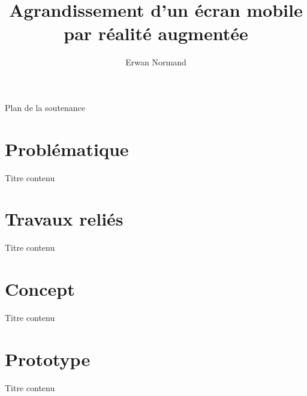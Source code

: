
\usepackage{lmodern}
\usepackage[french]{babel}
\usepackage[utf8]{inputenc}
\usepackage[T1]{fontenc}

 {
}

\title[Agrandissement d'un écran mobile par RA]{Agrandissement d'un écran mobile par réalité augmentée}
\author[Erwan Normand]{Erwan Normand}%
\date{}



\maketitle

\begin{frame}{Plan de la soutenance}
  \tableofcontents
\end{frame}


\section{Problématique} %
\begin{frame}{Titre}
  contenu
\end{frame}


\section{Travaux reliés} %
\begin{frame}{Titre}
  contenu
\end{frame}


\section{Concept} %
\begin{frame}{Titre}
  contenu
\end{frame}


\section{Prototype} %
\begin{frame}{Titre}
  contenu
\end{frame}


